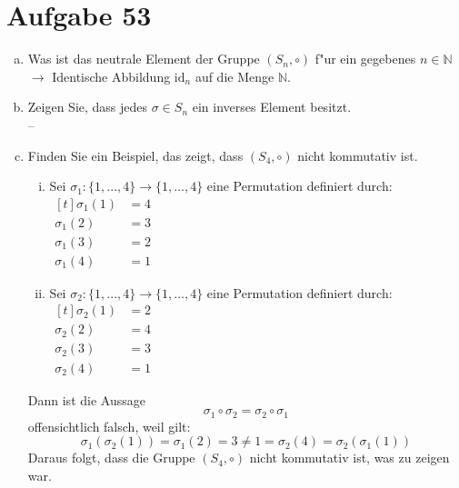 \documentclass[10pt, oneside]{article}
\begin{document}
\section{Aufgabe 53}

\begin{enumerate}[(a)]
    \item Was ist das neutrale Element der Gruppe $(S_n, \circ)$ f"ur ein gegebenes $n \in \mathbb{N}$ \\[5pt]
        $\rightarrow$ Identische Abbildung $\text{id}_n$ auf die Menge $\mathbb{N}$.
    \item Zeigen Sie, dass jedes $\sigma \in S_n$ ein inverses Element besitzt. \\[5pt]
        --
    \item Finden Sie ein Beispiel, das zeigt, dass $(S_4, \circ)$ nicht
        kommutativ ist.
        \begin{enumerate}[i)]
            \item Sei $\sigma_1: \{1,...,4\} \rightarrow \{1,...,4\}$ eine Permutation definiert durch: \\[5pt]
                $\begin{aligned}[t]
                    \sigma_1(1) &= 4 \\
                    \sigma_1(2) &= 3 \\
                    \sigma_1(3) &= 2 \\
                    \sigma_1(4) &= 1
                 \end{aligned}$
            \item Sei $\sigma_2: \{1,...,4\} \rightarrow \{1,...,4\}$ eine Permutation definiert durch: \\[5pt]
                $\begin{aligned}[t]
                    \sigma_2(1) &= 2 \\
                    \sigma_2(2) &= 4 \\
                    \sigma_2(3) &= 3 \\
                    \sigma_2(4) &= 1
                 \end{aligned}$
        \end{enumerate}
        Dann ist die Aussage
        \begin{equation*}
            \sigma_1 \circ \sigma_2 = \sigma_2 \circ \sigma_1
        \end{equation*}
        offensichtlich falsch, weil gilt:
        \begin{equation*}
            \sigma_1(\sigma_2(1)) = \sigma_1(2) = 3 \neq 1 = \sigma_2(4) = \sigma_2(\sigma_1(1))
        \end{equation*}
        Daraus folgt, dass die Gruppe $(S_4, \circ)$ nicht
        kommutativ ist, was zu zeigen war.
\end{enumerate}
\end{document}
